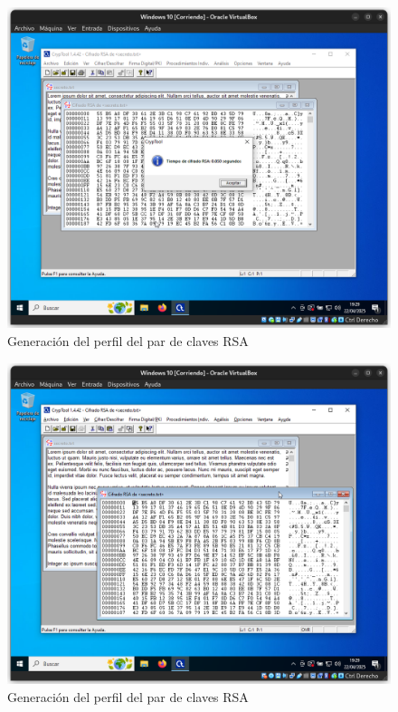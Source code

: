 \begin{figure}[h]
    \includegraphics[width=15cm]{EncriptadoRSA-2}
    \caption{Generación del perfil del par de claves RSA}
\end{figure}

\begin{figure}[h]
    \includegraphics[width=15cm]{EncriptadoRSA-3}
    \caption{Generación del perfil del par de claves RSA}
\end{figure}

